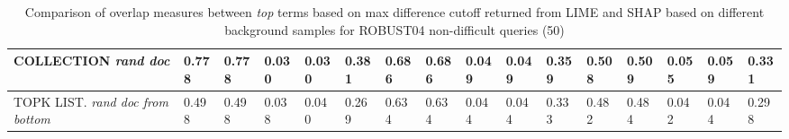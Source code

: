 \begin{table}
{\begin{tabular}{ |m{6em}|m{2em}|m{2em}|m{2em}|m{2em}|m{2.8em}||m{2em}|m{2em}|m{2em}|m{2em}|m{2.8em}||m{2em}|m{2em}|m{2em}|m{2em}|m{2.8em}|| }


COLLECTION \newline \textit{rand doc} & 0.778 & 0.778 & 0.030 & 0.030 & 0.381 & 0.686 & 0.686 & 0.049 & 0.049 & 0.359 & 0.508 & 0.509 & 0.055 & 0.059 & 0.331\\
\hline

TOPK LIST. \newline \textit{rand doc from bottom} & 0.498 & 0.498 & 0.038 & 0.040 & 0.269 & 0.634 & 0.634 & 0.044 & 0.044 & 0.333 & 0.482 & 0.484 & 0.042 & 0.044 & 0.298\\
\hline
 \end{tabular}}
\caption{Comparison of overlap measures between \textit{top} terms based on max difference cutoff returned from LIME and SHAP based on different background samples for ROBUST04 non-difficult queries (50)}
\label{table_norm_max_diff_terms}
\end{table}

